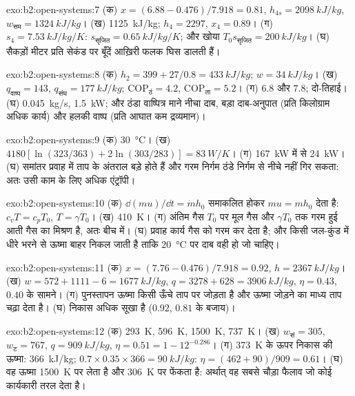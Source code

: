 \begin{solution}{exo:b2:open-systems:7}
(क) $x = (6.88 - 0.476)/7.918 = 0.81$, $h_{4s} = \qty{2098}{kJ/kg}$, $w_{\text{सम}} =
\qty{1324}{kJ/kg}$। (ख) \qty{1125}{kJ/kg}; $h_4 = 2297$, $x_4 = 0.89$। (ग) $s_4 =
\qty{7.53}{kJ/kg/K}$: $s_{\text{सृजित}} = \qty{0.65}{kJ/kg/K}$; और खोया $T_0s_{\text{सृजित}} =
\qty{200}{kJ/kg}$। (घ) सैकड़ों मीटर प्रति सेकंड पर बूँदें
आख़िरी फलक घिस डालती हैं।
\end{solution}

\begin{solution}{exo:b2:open-systems:8}
(क) $h_2 = 399 + 27/0.8 = \qty{433}{kJ/kg}$; $w = \qty{34}{kJ/kg}$। (ख) $q_{\text{वाष्प}}
= 143$, $q_{\text{संघ}} = \qty{177}{kJ/kg}$; $\mathrm{COP}_{\text{ठं}} = 4.2$,
$\mathrm{COP}_{\text{ता}} = 5.2$। (ग) $6.8$ और $7.8$; दो-तिहाई। (घ) \qty{0.045}{kg/s},
\qty{1.5}{kW}; और ठंडा वाष्पित्र माने नीचा दाब, बड़ा
दाब-अनुपात (प्रति किलोग्राम अधिक कार्य) और हलकी वाष्प (प्रति आघात कम
द्रव्यमान)।
\end{solution}

\begin{solution}{exo:b2:open-systems:9}
(क) \qty{30}{\celsius}। (ख) $4180[\ln(323/363) + 2\ln(303/283)] = \qty{83}{W/K}$।
(ग) \qty{167}{kW} में से \qty{24}{kW}। (घ) समांतर प्रवाह में ताप के अंतराल
बड़े होते हैं और गरम निर्गम ठंडे निर्गम से नीचे नहीं गिर सकता: अतः उसी काम के लिए
अधिक एंट्रॉपी।
\end{solution}

\begin{solution}{exo:b2:open-systems:10}
(क) $\dd(mu)/\dd t = \dot m h_0$ समाकलित होकर $mu = mh_0$ देता है: $c_vT = c_pT_0$,
$T = \gamma T_0$। (ख) \qty{410}{K}। (ग) अंतिम गैस $T_0$ पर मूल गैस और
$\gamma T_0$ तक गरम हुई आती गैस का मिश्रण है, अतः
बीच में। (घ) प्रवाह कार्य गैस को गरम कर देता है; और किसी जल-कुंड में धीरे
भरने से ऊष्मा बाहर निकल जाती है ताकि \qty{20}{\celsius} पर दाब वही हो
जो चाहिए।
\end{solution}

\begin{solution}{exo:b2:open-systems:11}
(क) $x = (7.76 - 0.476)/7.918 = 0.92$, $h = \qty{2367}{kJ/kg}$। (ख) $w = 572 + 1111
- 6 = \qty{1677}{kJ/kg}$, $q = 3278 + 628 = \qty{3906}{kJ/kg}$, $\eta = 0.43$,
$0.40$ के सामने। (ग) पुनस्तापन ऊष्मा किसी ऊँचे ताप पर जोड़ता है और
ऊष्मा जोड़ने का माध्य ताप चढ़ा देता है। (घ) निकास अधिक सूखा है
($0.92$, $0.81$ के बजाय)।
\end{solution}

\begin{solution}{exo:b2:open-systems:12}
(क) \qty{293}{K}, \qty{596}{K}, \qty{1500}{K}, \qty{737}{K}। (ख) $w_{\text{सं}} = 305$,
$w_{\text{ट}} = 767$, $q = \qty{909}{kJ/kg}$, $\eta = 0.51 = 1 - 12^{-0.286}$। (ग)
\qty{373}{K} के ऊपर निकास की ऊष्मा: \qty{366}{kJ/kg}; $0.7 \times 0.35 \times 366 =
\qty{90}{kJ/kg}$: $\eta = (462 + 90)/909 = 0.61$। (घ) वह ऊष्मा
\qty{1500}{K} पर लेता है और \qty{306}{K} पर फेंकता है: अर्थात् वह सबसे चौड़ा फैलाव जो कोई
कार्यकारी तरल देता है।
\end{solution}

